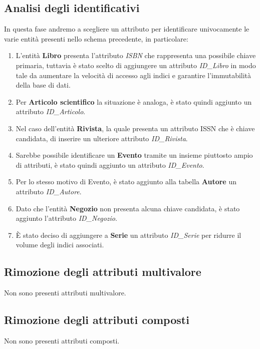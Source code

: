         \subsection{Analisi degli identificativi}
        In questa fase andremo a scegliere un attributo per identificare univocamente
        le varie entit\`a presenti nello schema precedente, in particolare:
            \begin{enumerate}
            \item L'entit\`a \textbf{Libro} presenta l'attributo \textit{ISBN} che rappresenta una possibile chiave primaria,
                  tuttavia \`e stato scelto di aggiungere un attributo \textit{ID\_Libro} in modo tale da aumentare
                  la velocit\`a di accesso agli indici e garantire l'immutabilit\`a della base di dati.
            \item Per \textbf{Articolo scientifico} la situazione \`e analoga, \`e stato quindi aggiunto un attributo
                  \textit{ID\_Articolo}.
            \item Nel caso dell'entit\`a \textbf{Rivista}, la quale presenta un attributo ISSN che \`e chiave candidata,
                  di inserire un ulteriore attributo \textit{ID\_Rivista}.
            \item Sarebbe possibile identificare un \textbf{Evento} tramite un insieme piuttosto ampio di attributi, \`e
                  stato quindi aggiunto un attributo \textit{ID\_Evento}.
            \item Per lo stesso motivo di Evento, \`e stato aggiunto alla tabella \textbf{Autore} un attributo \textit{ID\_Autore}.
            \item Dato che l'entit\`a \textbf{Negozio} non presenta alcuna chiave candidata, \`e stato aggiunto l'attributo
                  \textit{ID\_Negozio}.
            \item \`E stato deciso di aggiungere a \textbf{Serie} un attributo \textit{ID\_Serie} per ridurre il volume degli
                  indici associati.
            \end{enumerate}
        \subsection{Rimozione degli attributi multivalore}
            Non sono presenti attributi multivalore.
        \subsection{Rimozione degli attributi composti}
            Non sono presenti attributi composti.
